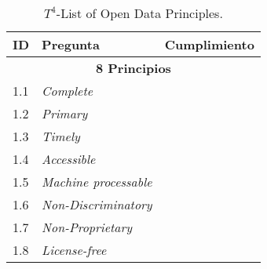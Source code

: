 \begin{table}[t]
\scriptsize
\renewcommand{\arraystretch}{1.3}
\begin{center}
\begin{tabular}[c]{|l|p{5cm}|c|} 
\hline
  \textbf{ID} & \textbf{Pregunta} &  \textbf{Cumplimiento}  \\\hline
  \multicolumn{3}{|c|}{\textbf{8 Principios}}  \\ \hline
   1.1& \textit{Complete} & \si  \\ \hline
   1.2&\textit{Primary} & \si  \\ \hline  
   1.3&\textit{Timely} & \si  \\ \hline  
   1.4&\textit{Accessible} & \si  \\ \hline  
   1.5&\textit{Machine processable} & \si  \\ \hline  
   1.6&\textit{Non-Discriminatory} & \si  \\ \hline  
   1.7&\textit{Non-Proprietary} &\si  \\ \hline
   1.8&\textit{License-free} & \si  \\ \hline                                                               
  \hline
  \end{tabular}
 \caption{$T^{4}$-List of Open Data Principles.}
  \label{table:validation-t4}
  \end{center}
\end{table} 



